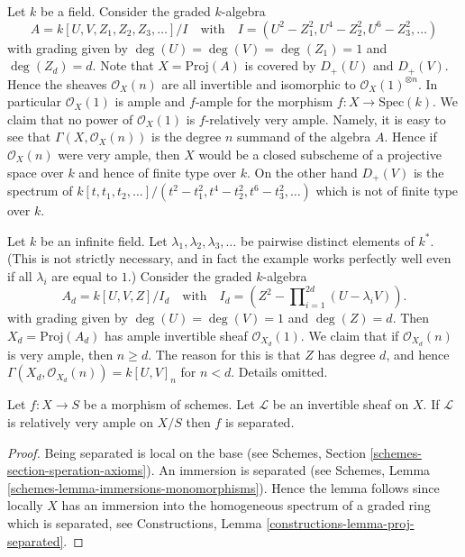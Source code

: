 \begin{example}
\label{example-not-finite-type-proj}
Let $k$ be a field.
Consider the graded $k$-algebra
$$
A = k[U, V, Z_1, Z_2, Z_3, \ldots]/I
\quad
\text{with}
\quad
I = (U^2 - Z_1^2, U^4 - Z_2^2, U^6 - Z_3^2, \ldots)
$$
with grading given by $\deg(U) = \deg(V) = \deg(Z_1) = 1$
and $\deg(Z_d) = d$.
Note that $X = \text{Proj}(A)$ is covered by $D_{+}(U)$ and
$D_{+}(V)$. Hence the sheaves $\mathcal{O}_X(n)$ are all
invertible and isomorphic to $\mathcal{O}_X(1)^{\otimes n}$.
In particular $\mathcal{O}_X(1)$ is ample and $f$-ample
for the morphism $f : X \to \text{Spec}(k)$.
We claim that no power of $\mathcal{O}_X(1)$ is $f$-relatively very ample.
Namely, it is easy to see that $\Gamma(X, \mathcal{O}_X(n))$
is the degree $n$ summand of the algebra $A$. Hence if $\mathcal{O}_X(n)$
were very ample, then $X$ would be a closed subscheme of a projective
space over $k$ and hence of finite type over $k$. On the other hand
$D_{+}(V)$ is the spectrum of
$k[t, t_1, t_2, \ldots]/(t^2 - t_1^2, t^4 - t_2^2, t^6 - t_3^2, \ldots)$
which is not of finite type over $k$.
\end{example}

\begin{example}
\label{example-not-bounded}
Let $k$ be an infinite field. Let $\lambda_1, \lambda_2, \lambda_3, \ldots$
be pairwise distinct elements of $k^*$. (This is not strictly necessary,
and in fact the example works perfectly well even if all $\lambda_i$
are equal to $1$.)
Consider the graded $k$-algebra
$$
A_d = k[U, V, Z]/I_d
\quad
\text{with}
\quad
I_d = (Z^2 - \prod\nolimits_{i = 1}^{2d} (U - \lambda_i V)).
$$
with grading given by $\deg(U) = \deg(V) = 1$ and $\deg(Z) = d$.
Then $X_d = \text{Proj}(A_d)$ has ample invertible sheaf
$\mathcal{O}_{X_d}(1)$. We claim that if $\mathcal{O}_{X_d}(n)$
is very ample, then $n \geq d$. The reason for this is that $Z$
has degree $d$, and hence $\Gamma(X_d, \mathcal{O}_{X_d}(n)) = 
k[U, V]_n$ for $n < d$. Details omitted.
\end{example}

\begin{lemma}
\label{lemma-relatively-very-ample-separated}
Let $f : X \to S$ be a morphism of schemes.
Let $\mathcal{L}$ be an invertible sheaf on $X$.
If $\mathcal{L}$ is relatively very ample on $X/S$ then
$f$ is separated.
\end{lemma}

\begin{proof}
Being separated is local on the base (see
Schemes, Section \ref{schemes-section-speration-axioms}).
An immersion is separated
(see Schemes, Lemma \ref{schemes-lemma-immersions-monomorphisms}).
Hence the lemma follows since locally $X$ has an immersion into
the homogeneous spectrum of a graded ring which is separated, see
Constructions, Lemma \ref{constructions-lemma-proj-separated}.
\end{proof}

